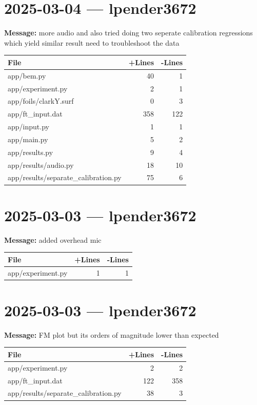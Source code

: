 \documentclass{article}
\begin{document}
\section*{2025-03-04 --- lpender3672}
\textbf{Message:} more audio and also tried doing two seperate calibration regressions which yield similar result need to troubleshoot the data

\begin{longtable}{|p{10cm}|r|r|}
\hline \textbf{File} & \textbf{+Lines} & \textbf{-Lines} \\
\hline
app/bem.py & 40 & 1 \\
\hline
app/experiment.py & 2 & 1 \\
\hline
app/foils/clarkY.surf & 0 & 3 \\
\hline
app/ft\_input.dat & 358 & 122 \\
\hline
app/input.py & 1 & 1 \\
\hline
app/main.py & 5 & 2 \\
\hline
app/results.py & 9 & 4 \\
\hline
app/results/audio.py & 18 & 10 \\
\hline
app/results/separate\_calibration.py & 75 & 6 \\
\hline
\end{longtable}

\section*{2025-03-03 --- lpender3672}
\textbf{Message:} added overhead mic

\begin{longtable}{|p{10cm}|r|r|}
\hline \textbf{File} & \textbf{+Lines} & \textbf{-Lines} \\
\hline
app/experiment.py & 1 & 1 \\
\hline
\end{longtable}

\section*{2025-03-03 --- lpender3672}
\textbf{Message:} FM plot but its orders of magnitude lower than expected

\begin{longtable}{|p{10cm}|r|r|}
\hline \textbf{File} & \textbf{+Lines} & \textbf{-Lines} \\
\hline
app/experiment.py & 2 & 2 \\
\hline
app/ft\_input.dat & 122 & 358 \\
\hline
app/results/separate\_calibration.py & 38 & 3 \\
\hline
\end{longtable}
\end{document}
